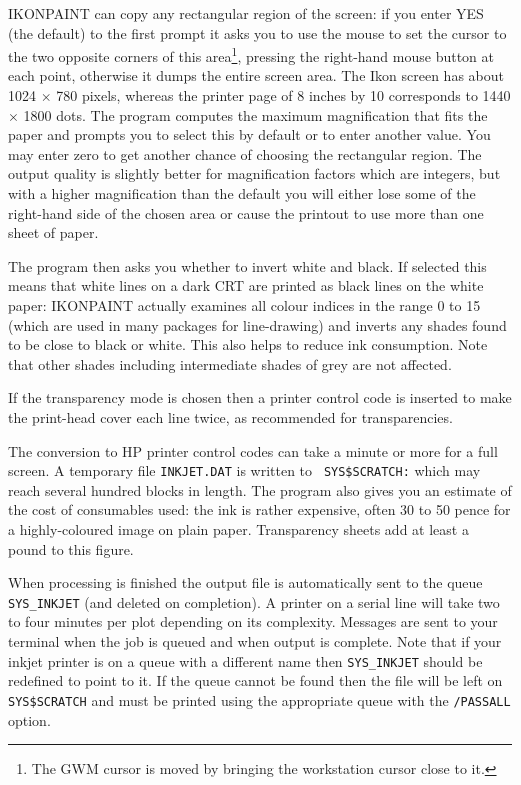IKONPAINT can copy any rectangular region of the screen: if you enter
YES (the default) to the first prompt it asks you to use the mouse to
set the cursor to the two opposite corners of this area\footnote{The GWM
cursor is moved by bringing the workstation cursor close to it.},
pressing the right-hand mouse button at each point, otherwise it dumps
the entire screen area.
The Ikon screen has about 1024 $\times$ 780 pixels, whereas
the printer page of 8 inches by 10 corresponds to 1440 $\times$ 1800
dots. The program computes the maximum magnification that fits the paper
and prompts you to select this by default or to enter another value. You
may enter zero to get another chance of choosing the rectangular region.
The output quality is slightly better for magnification factors which
are integers, but with a higher magnification than the default you will
either lose some of the right-hand side of the chosen area or cause the
printout to use more than one sheet of paper.

The program then asks you whether to invert white and black.  If selected
this means that white lines on a dark CRT are printed as black lines on
the white paper: IKONPAINT actually examines all colour indices in the
range 0 to 15 (which are used in many packages for line-drawing) and
inverts any shades found to be close to black or white. This also helps
to reduce ink consumption.  Note that other shades including
intermediate shades of grey are not affected.

If the transparency mode is chosen then a printer control code is
inserted to make the print-head cover each line twice, as recommended
for transparencies.

The conversion to HP printer control codes can take a minute or more for
a full screen. A temporary file {\tt INKJET.DAT} is written to {\tt
SYS\$SCRATCH:} which may reach several hundred blocks in length. The
program also gives you an estimate of the cost of consumables used: the
ink is rather expensive, often 30 to 50 pence for a highly-coloured
image on plain paper.  Transparency sheets add at least a pound to this
figure.

When processing is finished the output file is automatically sent to the
queue {\tt SYS\_INKJET} (and deleted on completion).  A printer on a
serial line will take two to four minutes per plot depending on its
complexity. Messages are sent to your terminal when the job is queued
and when output is complete.  Note that if your inkjet printer is on a
queue with a different name then {\tt SYS\_INKJET} should be redefined
to point to it.   If the queue cannot be found then the file will be
left on {\tt SYS\$SCRATCH} and must be printed using the appropriate
queue with the {\tt /PASSALL} option.

